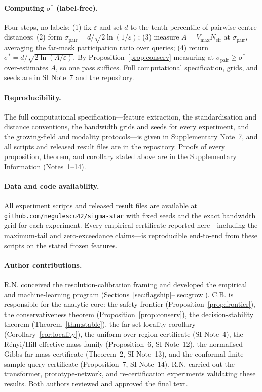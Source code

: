 \documentclass[10pt,twocolumn]{article}
\newcommand{\sstar}{\sigma^{*}}
\newcommand{\Neff}{N_{\mathrm{eff}}}
\begin{document}
\paragraph{Computing $\sstar$ (label-free).} Four steps, no labels: (1) fix $\varepsilon$ and set $d$ to the tenth percentile of pairwise centre distances; (2) form $\sigma_{\mathrm{pair}}=d/\sqrt{2\ln(1/\varepsilon)}$; (3) measure $A=V_{\max}\Neff$ at $\sigma_{\mathrm{pair}}$, averaging the far-mask participation ratio over queries; (4) return $\sstar=d/\sqrt{2\ln(A/\varepsilon)}$. By Proposition~\ref{prop:conserv} measuring at $\sigma_{\mathrm{pair}}\ge\sstar$ over-estimates $A$, so one pass suffices. Full computational specification, grids, and seeds are in SI Note~7 and the repository.


\paragraph{Reproducibility.} The full computational specification---feature extraction, the standardisation and distance conventions, the bandwidth grids and seeds for every experiment, and the growing-field and modality protocols---is given in Supplementary Note~7, and all scripts and released result files are in the repository. Proofs of every proposition, theorem, and corollary stated above are in the Supplementary Information (Notes~1--14).

\paragraph{Data and code availability.} All experiment scripts and released result files are available at \texttt{github.com/negulescu42/sigma-star} with fixed seeds and the exact bandwidth grid for each experiment. Every empirical certificate reported here---including the maximum-tail and zero-exceedance claims---is reproducible end-to-end from these scripts on the stated frozen features.


\paragraph{Author contributions.} R.N. conceived the resolution-calibration framing and developed the empirical and machine-learning program (Sections~\ref{sec:flagship}--\ref{sec:grow}). C.B. is responsible for the analytic core: the safety frontier (Proposition~\ref{prop:frontier}), the conservativeness theorem (Proposition~\ref{prop:conserv}), the decision-stability theorem (Theorem~\ref{thm:stable}), the far-set locality corollary (Corollary~\ref{cor:locality}), the uniform-over-region certificate (SI Note~4), the Rényi/Hill effective-mass family (Proposition~6, SI Note~12), the normalised Gibbs far-mass certificate (Theorem~2, SI Note~13), and the conformal finite-sample query certificate (Proposition~7, SI Note~14). R.N. carried out the transformer, prototype-network, and re-certification experiments validating these results. Both authors reviewed and approved the final text.
\end{document}
